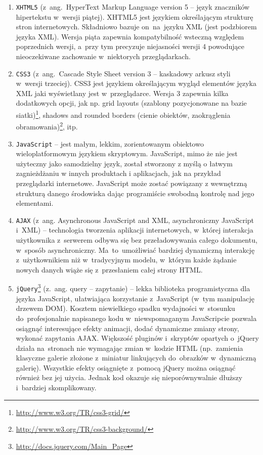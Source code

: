 \begin{enumerate}
  \item \texttt{XHTML5}\cite{html5doc} (z~ang.~HyperText Markup Language version 5 -- język znaczników hipertekstu w~wersji piątej). XHTML5 jest językiem określającym strukturę stron internetowych. Składniowo bazuje on~na~języku XML (jest podzbiorem języka XML). Wersja piąta zapewnia kompatybilność wsteczną względem poprzednich wersji, a~przy tym precyzuje niejasności wersji 4 powodujące nieoczekiwane zachowanie w~niektorych przeglądarkach.
  \item \texttt{CSS3}\cite{css3doc} (z~ang.~Cascade Style Sheet version 3 -- kaskadowy arkusz styli w~wersji trzeciej). CSS3 jest językiem określającym wygląd elementów języka XML jaki wyświetlany jest w~przeglądarce. Wersja 3 zapewnia kilka dodatkowych opcji, jak np. grid layouts (szablony pozycjonowane na bazie siatki)\footnote{\url{http://www.w3.org/TR/css3-grid/}}, shadows and rounded borders (cienie obiektów, zaokrąglenia obramowania)\footnote{\url{http://www.w3.org/TR/css3-background/}}, itp.
  \item \texttt{JavaScript} -- jest małym, lekkim, zorientowanym obiektowo wieloplatformowym językiem skryptowym. JavaScript, mimo że nie jest użyteczny jako samodzielny język, został stworzony z myślą o łatwym zagnieżdżaniu w innych produktach i aplikacjach, jak na przykład przeglądarki internetowe. JavaScript może zostać powiązany z wewnętrzną strukturą danego środowiska dając programiście swobodną kontrolę nad jego elementami.

  \item \texttt{AJAX} (z~ang. Asynchronous JavaScript and XML, asynchroniczny JavaScript i~XML) -- technologia tworzenia aplikacji internetowych, w~której interakcja użytkownika z~serwerem odbywa się bez przeładowywania całego dokumentu, w~sposób asynchroniczny. Ma~to~umożliwiać bardziej dynamiczną interakcję z~użytkownikiem niż w~tradycyjnym modelu, w~którym każde żądanie nowych danych wiąże się z~przesłaniem całej strony HTML.

  \item \texttt{jQuery}\footnote{\url{http://docs.jquery.com/Main\_Page}} (z.~ang. query -- zapytanie) -- lekka biblioteka programistyczna dla języka JavaScript, ułatwiająca korzystanie z~JavaScript (w~tym manipulację drzewem DOM). Kosztem niewielkiego spadku wydajności w~stosunku do~profesjonalnie napisanego kodu w~niewspomaganym JavaScripcie pozwala osiągnąć interesujące efekty animacji, dodać dynamiczne zmiany strony, wykonać zapytania AJAX. Większość pluginów i~skryptów opartych o~jQuery działa na~stronach nie wymagając zmian w~kodzie HTML (np.~zamienia klasyczne galerie złożone z~miniatur linkujących do~obrazków w~dynamiczną galerię). Wszystkie efekty osiągnięte z~pomocą jQuery można osiągnąć również bez jej użycia. Jednak kod okazuje się nieporównywalnie dłuższy i~bardziej skomplikowany.
\end{enumerate}
